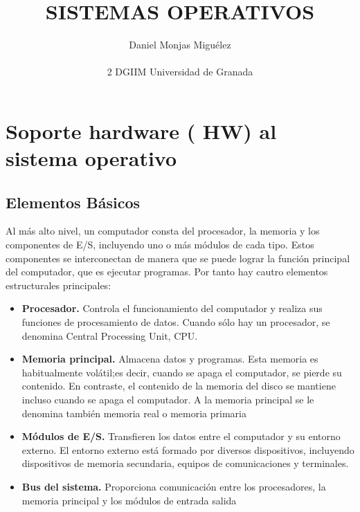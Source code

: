 \documentclass{article}
\author{Daniel Monjas Migu\'elez 
 		\\ \\ 2 DGIIM Universidad de Granada}
\title{SISTEMAS OPERATIVOS}
\begin{document}
\maketitle
\newpage
\tableofcontents
\newpage
\section{Soporte hardware (	HW) al sistema operativo}
	\subsection{Elementos Básicos}
		Al más alto nivel, un computador consta del procesador, la memoria y los componentes de E/S, incluyendo uno o más módulos de cada tipo. Estos componentes se interconectan de manera que se puede lograr la función principal del computador, que es ejecutar programas. Por tanto hay cautro elementos estructurales principales:
		\begin{itemize}
			\item \textbf{Procesador.} Controla el funcionamiento del computador y realiza sus funciones de procesamiento de datos. Cuando sólo hay un procesador, se denomina Central Processing Unit, CPU.
			\item \textbf{Memoria principal.} Almacena datos y programas. Esta memoria es habitualmente volátil;es decir, cuando se apaga el computador, se pierde su contenido. En contraste, el contenido de la memoria del disco se mantiene incluso cuando se apaga el computador. A la memoria principal se le denomina también memoria real o memoria primaria
			\item \textbf{Módulos de E/S.} Transfieren los datos entre el computador y su entorno externo. El entorno externo está formado por diversos dispositivos, incluyendo dispositivos de memoria secundaria, equipos de comunicaciones y terminales.
			\item \textbf{Bus del sistema.} Proporciona comunicación entre los procesadores, la memoria principal y los módulos de entrada salida
		\end{itemize}
		
\end{document}
